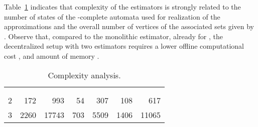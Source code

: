 \documentclass[a4paper, 10pt, conference]{ieeeconf}
\begin{document}
Table~\ref{tab:twotankl} indicates that complexity of the estimators is strongly related to the number of states  of the -complete automata used for realization of the approximations and the overall number of vertices of the associated sets  given by . Observe that, compared to the monolithic estimator, already for , the decentralized setup with two estimators requires a lower offline computational cost , and amount of memory .



\vspace{-5pt}
\begin{table}[!h]
	\centering
		\begin{tabular}{r|r@{  }r|r@{  }r|r@{  }r}
		\toprule
			 & \multicolumn{2}{|c|}{} & \multicolumn{2}{|c|}{} & \multicolumn{2}{c}{} \\
			&  &  &  &   &  &  \\
			\midrule
			2& 172 & 993 & 54 & 307 & 108 & 617\\
			3& 2260 &17743 &703 &5509 &1406 & 11065\\
			\bottomrule
		\end{tabular}
\caption{Complexity analysis.}
	\label{tab:twotankl}
\end{table}


\vspace{-23pt}
\end{document}
